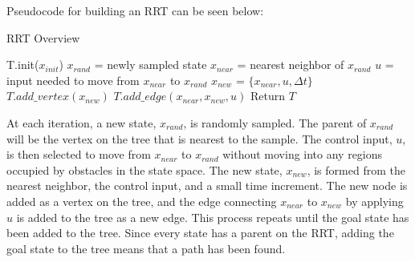 \documentclass[10pt,conference]{ieeeconf}
\begin{document}


Pseudocode for building an RRT can be seen below:

\begin{algorithm}
\caption{RRT Overview}
\begin{algorithmic}[1]
\State T.init($x_{init}$)
\State $x_{rand}$ = newly sampled state
\State $x_{near}$ = nearest neighbor of $x_{rand}$
\State $u$ = input needed to move from $x_{near}$ to $x_{rand}$
\State $x_{new}$ = $\{x_{near}, u, \Delta t\}$
\State $T.add\_vertex(x_{new})$
\State $T.add\_edge(x_{near}, x_{new}, u)$
\EndWhile
\State Return $T$
\EndFunction
\end{algorithmic}
\end{algorithm}

At each iteration, a new state, $x_{rand}$, is randomly sampled. The parent of $x_{rand}$ will be the vertex on the tree that is nearest to the sample. The control input, $u$, is then selected to move from $x_{near}$ to $x_{rand}$ without moving into any regions occupied by obstacles in the state space. The new state, $x_{new}$, is formed from the nearest neighbor, the control input, and a small time increment. The new node is added as a vertex on the tree, and the edge connecting $x_{near}$ to $x_{new}$ by applying $u$ is added to the tree as a new edge. This process repeats until the goal state has been added to the tree. Since every state has a parent on the RRT, adding the goal state to the tree means that a path has been found. 
\end{document}
